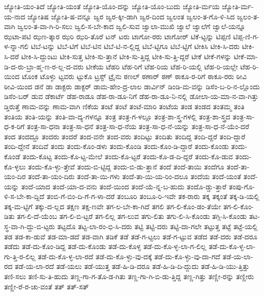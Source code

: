 {ಜ್ಯೋತಿ-ಯಂ-ತಿದೆ
ಜ್ಯೋತಿ-ಯಂತೆ
ಜ್ಯೋತಿ-ಯೊಂ-ದನ್ನು
ಜ್ಯೋತಿ-ಯೊಂ-ಬುದು
ಜ್ಯೋತಿ-ರ್ಮಯ
ಜ್ಯೋತಿ-ರ್ಮ-ಯ-ನಾದ
ಜ್ಯೋತಿಷ
ಜ್ಯೋತಿ-ಷ-ವನ್ನೂ
ಜ್ವರ
ಜ್ವರ-ಕ್ಕೀ-ಡಾಗಿ
ಜ್ವರ-ದಿಂದ
ಜ್ವಲಂತ
ಜ್ವಲಂ-ತ-ಗೊ-ಳಿ-ಸಿದ
ಜ್ವಲಂ-ತ-ವಾಗಿ
ಜ್ವಲಂ-ತ-ವಾ-ಗಿ-ರಿ-ಸಲು
ಜ್ವಲಿ-ಸ-ಬೇ-ಕಾದ
ಜ್ವಲಿ-ಸುವ
ಜ್ವಾಲಾ-ಮುಖಿ
ಜ್ವಾಲೆ
ಜ್ವಾಲೆಗೆ
ಜ್ವಾಲೆ-ಯನ್ನೂ
ಝಟಾ-ಪಟಿ
ಝಣ-ತ್ಕಾರ
ಝರಿ
ಝರಿ-ತೊರೆ
ಟನ್
ಟರು
ಟಾಗೋ-ರರು
ಟಾಗೋರ್
ಟಿಕೆ-ಟ್ಟನ್ನು
ಟಿಪ್ಪಣಿ
ಟಿಪ್ಪ-ಣಿ-ಗ-ಳ-ನ್ನಾ-ಗಲಿ
ಟಿಬೆ-ಟನ್ನು
ಟಿಬೆ-ಟಿಗೆ
ಟಿಬೆ-ಟಿನ
ಟಿಬೆ-ಟಿ-ನ-ಲ್ಲಿದ್ದ
ಟಿಬೆ-ಟ್ಟಿಗೂ
ಟಿಬೆ-ಟ್ಟಿಗೆ
ಟೀಕಿಸಿ
ಟೀಕಿ-ಸಿ-ದರು
ಟೀಕಿ-ಸಿ-ದರೆ
ಟೀಕಿ-ಸಿ-ದ್ದುಂಟು
ಟೀಕಿ-ಸುತ್ತ
ಟೀಕಿ-ಸು-ತ್ತಾನೆ
ಟೀಕಿ-ಸು-ತ್ತಿದ್ದ
ಟೀಕಿ-ಸು-ತ್ತಿ-ದ್ದರೆ
ಟೀಕೆ
ಟೀಕೆ-ಗಳನ್ನು
ಟೀಕೆ-ಮಾ-ಡಿ-ದ-ರು-ಬ್ರಾ-ಹ್ಮ-ಣ-ರ-ಲ್ಲ-ದ-ವರು
ಟೀಕೆಯ
ಟೆಹರಿ
ಟೆಹ-ರಿಗೆ
ಟೆಹ-ರಿಯ
ಟೆಹ-ರಿ-ಯಲ್ಲಿ
ಟೆಹ-ರಿ-ಯಲ್ಲೇ
ಟೆಹ-ರಿ-ಯಿಂದ
ಟೊಂಕ
ಟೊಳ್ಳು
ಟ್ಟವರು
ಟ್ಟುಕೊ
ಟ್ರಸ್ಟ್
ಟ್ರೈನು
ಠಣಲ್
ಠಣಾರ್
ಠಣ್
ಠಾಕೂ-ರ-ರಿಗೆ
ಠಾಕೂ-ರರು
ಠೀವಿ
ಠೀವಿ-ಯಿಂದ
ಡನೆ
ಡಾ
ಡಾಕ್ಟರು
ಡಾಕ್ಟರ್
ಡಾಮ-ಹೇಂ-ದ್ರ-ಲಾಲ
ಡಾರ್ವಿನ್
ಡಿಂಡಿ-ಮ-ವನ್ನು
ಡಿಸೆಂ-ಬ-ರಿ-ನ-ಲ್ಲೊಂದು
ಡಿಸೆಂ-ಬರ್
ಡುವ
ಡೆಕಾರ್ಟೆ
ಡೆಹ-ರಾಡೂ
ಡೆಹ-ರಾ-ಡೂ-ನಿಗೆ
ಡೆಹ-ರಾ-ಡೂ-ನಿ-ನಲ್ಲಿ
ಡೋಲಾ-ಯ-ಮಾ-ನ-ವಾ-ಗಿತ್ತು
ಡ್ತಿರುತ್ತೆ
ಣಾಮ-ವನ್ನು
ಣಾಮ-ವಾಗಿ
ಣಿಕೆಯ
ತಂಟೆ
ತಂಟೆ
ತಂಟೆ-ಮಾರಿ
ತಂಟೆಯ
ತಂಡ
ತಂಡದ
ತಂತಮ್ಮ
ತಂತಿ
ತಂತಿಯ
ತಂತಿ-ಯನ್ನು
ತಂತಿ-ವಾ-ದ್ಯ-ಗಳನ್ನೂ
ತಂತ್ರ
ತಂತ್ರ-ಗ-ಳಲ್ಲೂ
ತಂತ್ರ-ಶಾ-ಸ್ತ್ರ-ಗಳಲ್ಲಿ
ತಂತ್ರ-ಶಾ-ಸ್ತ್ರದ
ತಂತ್ರ-ಸಾ-ಧ-ಕ-ರಿಗೆ
ತಂತ್ರ-ಸಾ-ಧನಾ
ತಂತ್ರ-ಸಾ-ಧನೆ
ತಂತ್ರ-ಸಾ-ಧ-ನೆಯ
ತಂತ್ರ-ಸಾ-ಧ-ನೆ-ಯನ್ನು
ತಂತ್ರ-ಸಾ-ಧ-ನೆ-ಯೆಂ-ದರೆ
ತಂದ
ತಂದದ್ದೂ
ತಂದರು
ತಂದರೆ
ತಂದ-ವನೇ
ತಂದ-ವರು
ತಂದಿಟ್ಟು
ತಂದಿತು
ತಂದಿದ್ದ
ತಂದಿ-ದ್ದರೆ
ತಂದಿ-ದ್ದಾರೆ
ತಂದಿ-ದ್ದೇನೆ
ತಂದಿವೆ
ತಂದು
ತಂದು-ಕೊಂ-ಡಳು
ತಂದು-ಕೊಂಡಿ
ತಂದು-ಕೊಂ-ಡಿ-ದ್ದಾರೆ
ತಂದು-ಕೊಂಡು
ತಂದು-ಕೊಂಡೆ
ತಂದು-ಕೊಟ್ಟ
ತಂದು-ಕೊ-ಟ್ಟ-ಮೇಲೆ
ತಂದು-ಕೊ-ಟ್ಟರೆ
ತಂದು-ಕೊ-ಡ-ದಿ-ದ್ದರೆ
ತಂದು-ಕೊ-ಡುವ
ತಂದು-ಕೊ-ಳ್ಳಲು
ತಂದು-ಕೊ-ಳ್ಳು-ತ್ತೇವೆ
ತಂದು-ಬಿ-ಟ್ಟಿದ್ದ
ತಂದು-ಬಿ-ಡು-ತ್ತಾನೆ
ತಂದೆ
ತಂದೆ-ತಾಯಿ
ತಂದೆಗೂ
ತಂದೆ-ತಾ-ಯಂ-ದಿರ
ತಂದೆ-ತಾ-ಯಂ-ದಿರು
ತಂದೆ-ತಾ-ಯಿ-ಗಳು
ತಂದೆ-ತಾ-ಯಿ-ಯ-ರಿಂ-ದಲೂ
ತಂದೆಯ
ತಂದೆ-ಯಂತೆ
ತಂದೆ-ಯನ್ನು
ತಂದೆ-ಯಾದ
ತಂದೆ-ಯಾ-ದ-ವನು
ತಂದೆ-ಯಿಂದ
ತಂದೆ-ಯೆ-ನ್ನ-ಬ-ಹುದು
ತಂದೊ-ಡ್ಡು-ತ್ತಾರೆ
ತಂಪು-ಗೊ-ಳಿ-ಸ-ಬೇ-ಕಾ-ದ್ದಿದೆ
ತಂಬಿ-ಗೆ-ಬಿಂ-ದಿ-ಗೆ-ಗ-ಳಾ-ದರೆ
ತಂಬೂರಿ
ತಂಬೂ-ರಿ-ಇವೇ
ತಕ-ರಾರು
ತಕ್ಕ
ತಕ್ಕಂತೆ
ತಕ್ಕ-ಡಿ-ಯಲ್ಲಿ
ತಕ್ಕ-ಮ-ಟ್ಟಿಗೆ
ತಕ್ಕು-ದ-ಲ್ಲದ
ತಕ್ಷಣ
ತಕ್ಷ-ಣವೇ
ತಗ-ಲ-ಬೇ-ಕಾ-ಗಿದೆ
ತಗಲಿ
ತಗ-ಲಿ-ಕೊಂ-ಡಂ-ತೆಯೇ
ತಗ-ಲಿ-ಕೊಂ-ಡಿತು
ತಗ-ಲಿ-ದೆ-ಯೆಂಬ
ತಗ-ಲಿ-ಬಿ-ಟ್ಟರೆ
ತಗ-ಲಿಲ್ಲ
ತಗ-ಲುವ
ತಗು-ಲಿತು
ತಗು-ಲಿ-ಸಿ-ಕೊಂಡು
ತಗ್ಗಿ-ಸಿ-ಕೊಂಡು
ತಟ-ಸ್ಥ-ವಾ-ಗಿ-ದ್ದು-ಬಿ-ಟ್ಟರು
ತಟ್ಟದೊ
ತಟ್ಟ-ಲಾ-ರಂ-ಭಿ-ಸಿ-ದರು
ತಟ್ಟಿ
ತಟ್ಟಿ-ದರು
ತಟ್ಟಿ-ದಾ-ಗಲೇ
ತಟ್ಟುತ್ತ
ತಟ್ಟೆ
ತಟ್ಟೆ-ಯಲ್ಲಿ
ತಡ
ತಡ-ಕಾ-ಡುವೆ
ತಡ-ಮಾ-ಡದೆ
ತಡ-ವಾಗಿ
ತಡಿಕೆ
ತಡೆ
ತಡೆ-ಗ-ಟ್ಟಲು
ತಡೆ-ಗ-ಟ್ಟುವ
ತಡೆದ
ತಡೆ-ದರು
ತಡೆ-ದರೂ
ತಡೆದು
ತಡೆ-ದು-ಕೊಂ-ಡಿದ್ದ
ತಡೆ-ದು-ಕೊಂಡು
ತಡೆ-ದು-ಕೊಳ್ಳ
ತಡೆ-ದು-ಕೊ-ಳ್ಳ-ಲಾ-ಗ-ಲಿಲ್ಲ
ತಡೆ-ದು-ಕೊ-ಳ್ಳ-ಲಾ-ಗು-ತ್ತಿ-ರ-ಲಿಲ್ಲ
ತಡೆ-ದು-ಕೊ-ಳ್ಳ-ಲಾ-ರದೆ
ತಡೆ-ದು-ಕೊ-ಳ್ಳು-ವು-ದಕ್ಕೆ
ತಡೆ-ದು-ಕೊ-ಳ್ಳು-ವು-ದಾ-ಗದೆ
ತಡೆ-ಯ-ಲಾ-ರದ
ತಡೆ-ಯ-ಲಾ-ರದೆ
ತಡೆ-ಯಲು
ತಡೆ-ಯುತ್ತ
ತಡೆ-ಹಿ-ಡಿ-ದರೂ
ತಡೆ-ಹಿ-ಡಿ-ದಿ-ದ್ದುದು
ತಡೆ-ಹಿ-ಡಿ-ಯು-ತ್ತಿತ್ತು
ತಣಿ-ಸಲು
ತಣಿ-ಸು-ತಿ-ಹುದು
ತಣ್ಣ-ಗಾ-ಗ-ತೊ-ಡ-ಗಿತು
ತಣ್ಣ-ಗಾ-ಗಿ-ಬಿ-ಡು-ತ್ತಿದ್ದ
ತಣ್ಣ-ಗಿತ್ತು
ತಣ್ಣೀ-ರನ್ನು
ತಣ್ಣೀರು
ತಣ್ಣೀ-ರೆ-ರ-ಚು-ವಂತೆ
ತತ್
ತತ್-ಸತ್
}
